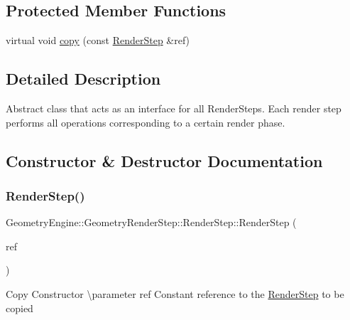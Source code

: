 \subsection*{Protected Member Functions}
\begin{DoxyCompactItemize}
\item 
virtual void \mbox{\hyperlink{class_geometry_engine_1_1_geometry_render_step_1_1_render_step_afe0321446beeb4093dba701424ec1e8c}{copy}} (const \mbox{\hyperlink{class_geometry_engine_1_1_geometry_render_step_1_1_render_step}{Render\+Step}} \&ref)
\end{DoxyCompactItemize}


\subsection{Detailed Description}
Abstract class that acts as an interface for all Render\+Steps. Each render step performs all operations corresponding to a certain render phase. 

\subsection{Constructor \& Destructor Documentation}
\mbox{\label{class_geometry_engine_1_1_geometry_render_step_1_1_render_step_a0a1c36303ca0342f1bf9afcecb35e513}} 
\subsubsection{\texorpdfstring{RenderStep()}{RenderStep()}}
{\footnotesize\ttfamily Geometry\+Engine\+::\+Geometry\+Render\+Step\+::\+Render\+Step\+::\+Render\+Step (\begin{DoxyParamCaption}\item[{const \mbox{\hyperlink{class_geometry_engine_1_1_geometry_render_step_1_1_render_step}{Render\+Step}} \&}]{ref }\end{DoxyParamCaption})\hspace{0.3cm}{\ttfamily [inline]}}

Copy Constructor \textbackslash{}parameter ref Constant reference to the \mbox{\hyperlink{class_geometry_engine_1_1_geometry_render_step_1_1_render_step}{Render\+Step}} to be copied 

